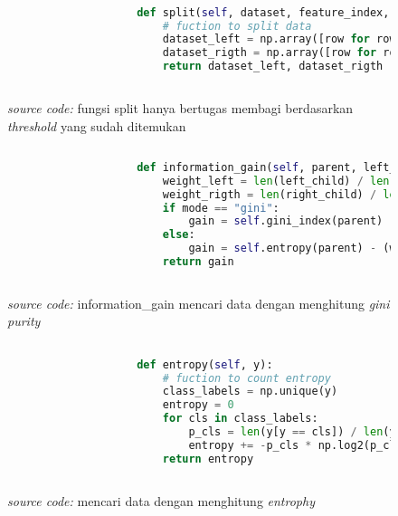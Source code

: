 		\begin{figure}[H]
			\begin{lstlisting}[language=Python, basicstyle=\tiny]

					def split(self, dataset, feature_index, threshold):
						# fuction to split data 
						dataset_left = np.array([row for row in dataset if row[feature_index] <= threshold])
						dataset_rigth = np.array([row for row in dataset if row[feature_index] > threshold])
						return dataset_left, dataset_rigth
			
			\end{lstlisting}
			\caption{\emph{source code:} fungsi split hanya bertugas membagi berdasarkan \textit{threshold} 
			yang sudah ditemukan}
			\label{code: split function}
		\end{figure}

		\begin{figure}[H]
			\begin{lstlisting}[language=Python, basicstyle=\tiny]
					
					def information_gain(self, parent, left_child, right_child, mode="entropy"):
						weight_left = len(left_child) / len(parent)
						weight_rigth = len(right_child) / len(parent)
						if mode == "gini":
							gain = self.gini_index(parent) - (weight_left * self.gini_index(left_child) + weight_rigth * self.gini_index(right_child))
						else:
							gain = self.entropy(parent) - (weight_left * self.entropy(left_child) + weight_rigth * self.entropy(right_child))
						return gain
					
			\end{lstlisting}
			\caption{\emph{source code:} information\_gain mencari data dengan menghitung \emph{gini purity}}
			\label{code: split function}
		\end{figure}
		
		\begin{figure}[H]
			\begin{lstlisting}[language=Python, basicstyle=\tiny]

					def entropy(self, y):
						# fuction to count entropy
						class_labels = np.unique(y)
						entropy = 0
						for cls in class_labels:
							p_cls = len(y[y == cls]) / len(y)
							entropy += -p_cls * np.log2(p_cls)
						return entropy
					
			\end{lstlisting}
			\caption{\emph{source code:} mencari data dengan menghitung \emph{entrophy}}
			\label{code: entrophy calculation function}
		\end{figure}

